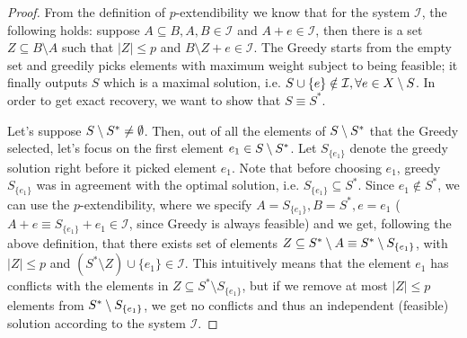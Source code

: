 \begin{proof}
From the definition of $p$-extendibility we know that for the system $\mathcal{I}$, the following holds: suppose $A\subseteq B, A,B \in \mathcal{I}$ and $A+e \in \mathcal{I}$, then there is a set $Z\subseteq B\setminus A$ such that $|Z|\le p$ and $B\setminus Z+e \in \mathcal{I}$. The Greedy starts from the empty set and greedily picks elements with maximum weight subject to being feasible; it finally outputs $S$ which is a maximal solution, i.e. $S\cup \{e\}\notin \mathcal{I}, \forall e\in X\setminus S$. In order to get exact recovery, we want to show that $S\equiv S^*$. 

Let's suppose $S\setminus S^*\neq \emptyset$. Then, out of all the elements of $S\setminus S^*$ that the Greedy selected, let's focus on the first element $e_1\in S\setminus S^*$. Let $S_{\{e_1\}}$ denote the greedy solution right before it picked element $e_1$. Note that before choosing $e_1$, greedy $S_{\{e_1\}}$ was in agreement with the optimal solution, i.e. $S_{\{e_1\}}\subseteq S^*$. Since $e_1 \not \in S^*$, we can use the $p$-extendibility, where we specify $A=S_{\{e_1\}}, B=S^*, e=e_1$ ($A+e \equiv S_{\{e_1\}} + e_1 \in \mathcal{I}$, since Greedy is always feasible) and we get, following the above definition, that there exists set of elements $Z\subseteq S^*\setminus A \equiv S^*\setminus S_{\{e_1\}}$, with $|Z|\le p$ and $(S^*\setminus Z)\cup\{e_1\} \in \mathcal{I}$. This intuitively means that the element $e_1$ has conflicts with the elements in $Z\subseteq S^* \setminus S_{\{e_1\}}$, but if we remove at most $|Z|\le p$ elements from $S^*\setminus S_{\{e_1\}}$, we get no conflicts and thus an independent (feasible) solution according to the system $\mathcal{I}$. 


\end{proof}
